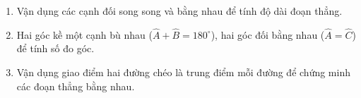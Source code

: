 \begin{enumerate}
\item Vận dụng các cạnh đối song song và bằng nhau để tính độ dài đoạn thẳng.
\item Hai góc kề một cạnh bù nhau ($\widehat{A} + \widehat{B} = 180^\circ$), hai góc đối bằng nhau ($\widehat{A} = \widehat{C}$) để tính số đo góc.
\item Vận dụng giao điểm hai đường chéo là trung điểm mỗi đường để chứng minh các đoạn thẳng bằng nhau.
\end{enumerate}

